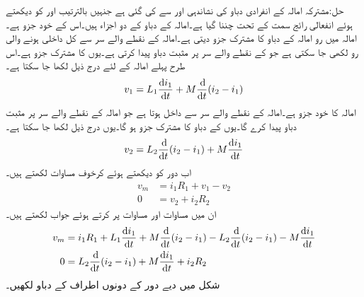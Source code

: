 حل:مشترکہ امالہ کے انفرادی دباو کی نشاندہی  اور  سے کی گئی ہے جنہیں بالترتیب  اور  کو دیکھتے ہوئے انفعالی رائج سمت کے تحت چننا گیا ہے۔امالہ  کے دباو کے دو اجزاء ہیں۔اس کے خود جزو  ہے۔امالہ  میں رو امالہ  کے دباو کا مشترک جزو دیتی ہے۔امالہ  کے نقطے والے سر سے کل داخلی ہونے والی رو  لکھی جا سکتی ہے جو  کے نقطے والے سر پر مثبت دباو پیدا کرتی ہے۔یوں  کا مشترک جزو  ہے۔اس طرح پہلے امالہ کے لئے درج ذیل لکھا جا سکتا ہے۔
\begin{align}\label{مساوات_مقناطیسی_مثال_مشترک_الف}
v_1=L_1 \frac{\dif i_1}{\dif t}+M\frac{\dif}{\dif t}(i_2-i_1)
\end{align}
امالہ  کا خود جزو  ہے۔امالہ  کے نقطے والے سر سے  داخل ہوتا ہے جو امالہ  کے نقطے والے سر پر مثبت دباو پیدا کرے گا۔یوں  کے دباو کا مشترک جزو  ہو گا۔یوں درج ذیل لکھا جا سکتا ہے۔
\begin{align}\label{مساوات_مقناطیسی_مثال_مشترک_ب}
v_2=L_2 \frac{\dif}{\dif t}(i_2-i_1)+M\frac{\dif i_1}{\dif t}
\end{align}
اب دور کو دیکھتے ہوئے کرخوف مساوات لکھتے ہیں۔
\begin{align}\label{مساوات_مقناطیسی_مثال_مشترک_پ}
v_m&=i_1 R_1+v_1-v_2\\
0&=v_2+i_2 R_2
\end{align}
ان میں مساوات  اور مساوات   پر کرتے ہوئے جواب لکھتے ہیں۔
\begin{align}
v_m&=i_1 R_1+L_1 \frac{\dif i_1}{\dif t}+M\frac{\dif}{\dif t}(i_2-i_1)-L_2 \frac{\dif}{\dif t}(i_2-i_1)-M\frac{\dif i_1}{\dif t}\\
0&=L_2 \frac{\dif}{\dif t}(i_2-i_1)+M\frac{\dif i_1}{\dif t}+i_2 R_2
\end{align}
شکل  میں دیے دور کے  دونوں اطراف کے دباو لکھیں۔
